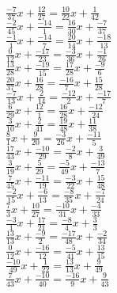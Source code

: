 \documentclass[12pt]{article}
\begin{document}
$\frac{-7}{37}x + \frac{12}{27} = \frac{10}{22}x + \frac{1}{42}$\\
$\frac{-2}{45}x + \frac{-14}{1} = \frac{16}{30}x + \frac{-7}{37}$\\
$\frac{-1}{1}x + \frac{-14}{7} = \frac{20}{14}x + \frac{-18}{13}$\\
$\frac{0}{12}x + \frac{-17}{23} = \frac{-3}{36}x + \frac{-1}{26}$\\
$\frac{13}{28}x + \frac{-19}{15} = \frac{17}{28}x + \frac{-9}{6}$\\
$\frac{20}{37}x + \frac{16}{28} = \frac{-16}{7}x + \frac{15}{28}$\\
$\frac{-7}{13}x + \frac{2}{14} = \frac{-12}{2}x + \frac{-17}{7}$\\
$\frac{6}{29}x + \frac{12}{1} = \frac{16}{28}x + \frac{-12}{24}$\\
$\frac{3}{10}x + \frac{2}{41} = \frac{19}{48}x + \frac{11}{38}$\\
$\frac{8}{1}x + \frac{9}{20} = \frac{-3}{26}x + \frac{-11}{5}$\\
$\frac{17}{43}x + \frac{-10}{29} = \frac{-2}{8}x + \frac{3}{49}$\\
$\frac{3}{19}x + \frac{5}{29} = \frac{-5}{49}x + \frac{-13}{7}$\\
$\frac{7}{45}x + \frac{-11}{19} = \frac{-3}{22}x + \frac{15}{48}$\\
$\frac{-2}{15}x + \frac{-6}{13} = \frac{-8}{35}x + \frac{-7}{24}$\\
$\frac{7}{3}x + \frac{10}{27} = \frac{-10}{31}x + \frac{-4}{33}$\\
$\frac{-3}{1}x + \frac{17}{21} = \frac{-8}{4}x + \frac{3}{3}$\\
$\frac{13}{13}x + \frac{-9}{2} = \frac{-17}{48}x + \frac{-2}{34}$\\
$\frac{0}{12}x + \frac{-16}{12} = \frac{-5}{41}x + \frac{13}{15}$\\
$\frac{-10}{49}x + \frac{1}{22} = \frac{13}{13}x + \frac{9}{49}$\\
$\frac{7}{43}x + \frac{-10}{40} = \frac{-16}{9}x + \frac{9}{43}$\\
\end{document}
